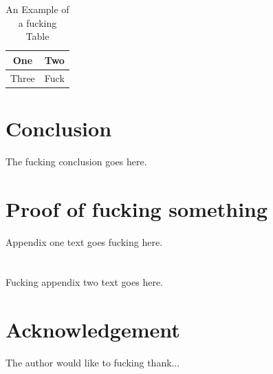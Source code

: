\documentclass[journal,transmag]{IEEEtran}
\begin{document}
	\begin{table}[!t]
		\renewcommand{\arraystretch}{1.3}
		\caption{An Example of a fucking Table}
		\label{table_example}
		\centering
		\begin{tabular}{|c|c|}
			\hline
			One & Two\\
			\hline
			Three & Fuck\\
			\hline
		\end{tabular}
	\end{table}
	
	\section{Conclusion}
	The fucking conclusion goes here.
	
	\newpage
	
	\appendices
	\section{Proof of fucking something}
	Appendix one text goes fucking here.
	
	\section{}
	Fucking appendix two text goes here.
	
	\section*{Acknowledgement}
	The author would like to fucking thank...
	
	
	
	
\end{document}
